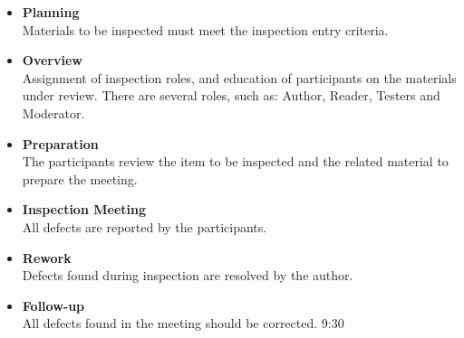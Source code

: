 \documentclass{article}
\begin{document}
\begin{itemize}
	\item \textbf{Planning}
	\vspace{.2cm} \\
	Materials to be inspected must meet the inspection entry criteria.
	
	\item \textbf{Overview}
	\vspace{.2cm} \\
	Assignment of inspection roles, and education of participants on the materials under review. There are several roles, such as: Author, Reader, Testers and Moderator.
	
	\item \textbf{Preparation}
	\vspace{.2cm} \\
	The participants review the item to be inspected and the related material to prepare the meeting.
	
	\item \textbf{Inspection Meeting}
	\vspace{.2cm} \\
	All defects are reported by the participants.
	
	\item \textbf{Rework}
	\vspace{.2cm} \\
	Defects found during inspection are resolved by the author.
	
	\item \textbf{Follow-up}
	\vspace{.2cm} \\
	All defects found in the meeting should be corrected. 9:30
\end{itemize}

\end{document}
